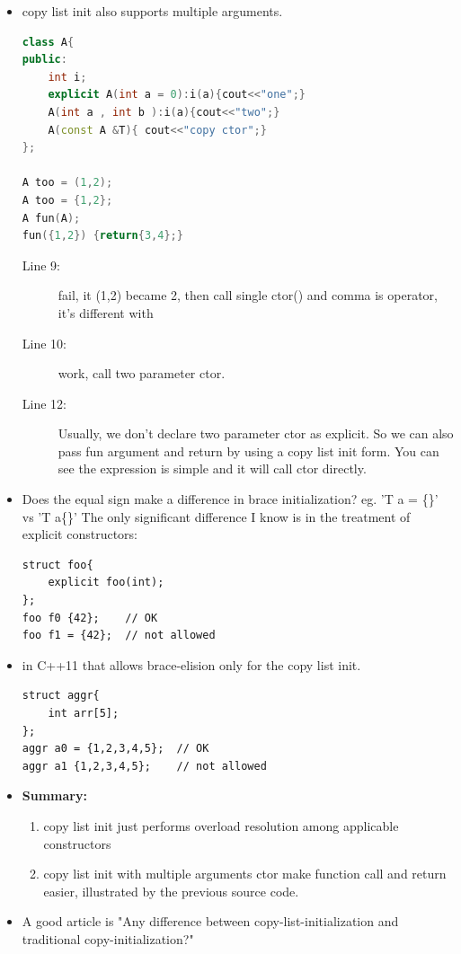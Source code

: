 \documentclass[a4paper,11pt,twoside]{book}
\begin{document}
\begin{itemize}
	
\item copy list init also supports multiple arguments.
\begin{lstlisting}[frame=single, language=c++]
class A{
public:
	int i;
	explicit A(int a = 0):i(a){cout<<"one";}
	A(int a , int b ):i(a){cout<<"two";}
	A(const A &T){ cout<<"copy ctor";} 
};
	
A too = (1,2); 
A too = {1,2};
A fun(A);
fun({1,2}) {return{3,4};}
\end{lstlisting}
	\begin{description}
		\item[Line 9:] fail, it (1,2) became 2, then call single ctor() and comma is operator, it's different with {}
		
		\item[Line 10:] work, call two parameter ctor. 
		
		\item[Line 12:] Usually, we don't declare two parameter ctor as explicit. So we can also pass fun argument and return by using a copy list init form. You can see the expression is simple and it will call ctor directly. 
	\end{description}

\item Does the equal sign make a difference in brace initialization? eg. 'T a = \{\}' vs 'T a\{\}' The only significant difference I know is in the treatment of explicit constructors:
\begin{lstlisting}
struct foo{
	explicit foo(int);
};
foo f0 {42};    // OK
foo f1 = {42};  // not allowed
\end{lstlisting}

\item in C++11 that allows brace-elision only for the copy list init.
\begin{lstlisting}
struct aggr{
	int arr[5];
};
aggr a0 = {1,2,3,4,5};  // OK
aggr a1 {1,2,3,4,5};    // not allowed
\end{lstlisting}

\item \textbf{Summary:}
\begin{enumerate}
	\item copy list init just performs overload resolution among applicable constructors
	
	\item copy list init with multiple arguments ctor make function call and return easier, illustrated by the previous source code.
\end{enumerate}

	\item A good article is "Any difference between copy-list-initialization and traditional copy-initialization?"
	

\end{itemize}
\end{document}
